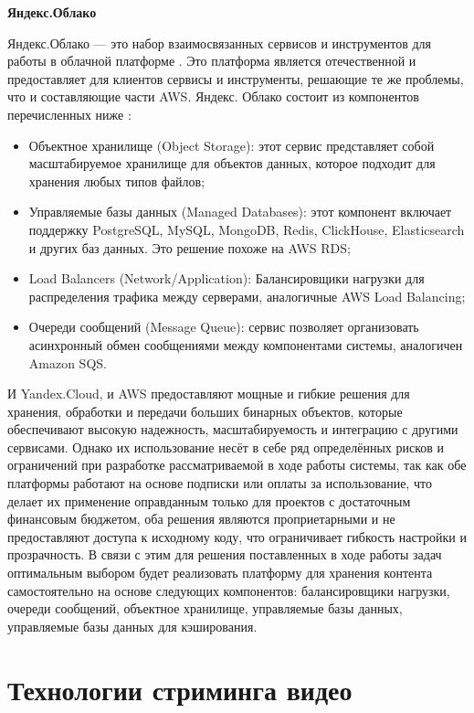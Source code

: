 	\textbf{Яндекс.Облако}

	Яндекс.Облако — это набор взаимосвязанных сервисов и инструментов для работы в облачной платформе \cite{migratovYandexCloud}. Это платформа является отечественной и предоставляет для клиентов сервисы и инструменты, решающие те же проблемы, что и составляющие части AWS. Яндекс. Облако состоит из компонентов перечисленных ниже \cite{yandexDocs}:

	
	\begin{itemize}[label=$\bullet$]
		\item Объектное хранилище (Object Storage): этот сервис представляет собой масштабируемое хранилище для объектов данных, которое подходит для хранения любых типов файлов;
		\item Управляемые базы данных (Managed Databases): этот компонент включает поддержку PostgreSQL, MySQL, MongoDB, Redis, ClickHouse, Elasticsearch и других баз данных. Это решение похоже на AWS RDS;
		\item Load Balancers (Network/Application): Балансировщики нагрузки для распределения трафика между серверами, аналогичные AWS Load Balancing;
		\item Очереди сообщений (Message Queue): сервис позволяет организовать асинхронный обмен сообщениями между компонентами системы, аналогичен Amazon SQS.
	\end{itemize}

	И Yandex.Cloud, и AWS предоставляют мощные и гибкие решения для хранения, обработки и передачи больших бинарных объектов, которые обеспечивают высокую надежность, масштабируемость и интеграцию с другими сервисами. Однако их использование несёт в себе ряд определённых рисков и ограничений при разработке рассматриваемой в ходе работы системы, так как обе платформы работают на основе подписки или оплаты за использование, что делает их применение оправданным только для проектов с достаточным финансовым бюджетом, оба решения являются проприетарными и не предоставляют доступа к исходному коду, что ограничивает гибкость настройки и прозрачность. В связи с этим для решения поставленных в ходе работы задач оптимальным выбором будет реализовать платформу для хранения контента самостоятельно на основе следующих компонентов: балансировщики нагрузки, очереди сообщений, объектное хранилище, управляемые базы данных, управляемые базы данных для кэширования.
	

\section{Технологии стриминга видео} \label{ch1:sec1}

